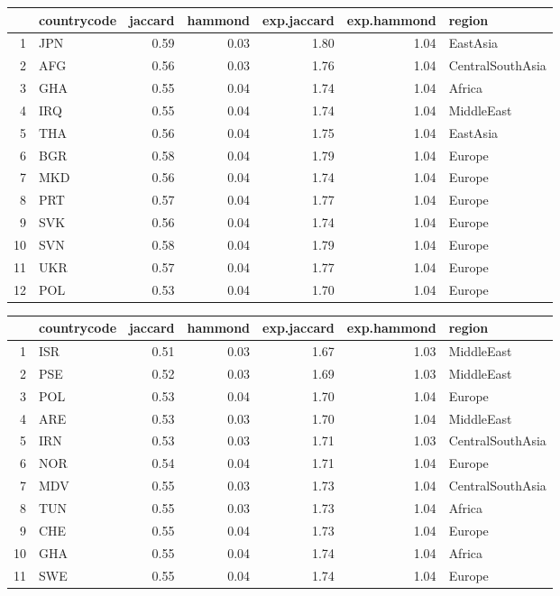 \documentclass[10pt,a4paper]{article}
\begin{document}
\begin{table}[ht]
\centering
\begin{tabular}{rlrrrrl}
  \hline
 & countrycode & jaccard & hammond & exp.jaccard & exp.hammond & region \\ 
  \hline
1 & JPN & 0.59 & 0.03 & 1.80 & 1.04 & EastAsia \\ 
  2 & AFG & 0.56 & 0.03 & 1.76 & 1.04 & CentralSouthAsia \\ 
  3 & GHA & 0.55 & 0.04 & 1.74 & 1.04 & Africa \\ 
  4 & IRQ & 0.55 & 0.04 & 1.74 & 1.04 & MiddleEast \\ 
  5 & THA & 0.56 & 0.04 & 1.75 & 1.04 & EastAsia \\ 
  6 & BGR & 0.58 & 0.04 & 1.79 & 1.04 & Europe \\ 
  7 & MKD & 0.56 & 0.04 & 1.74 & 1.04 & Europe \\ 
  8 & PRT & 0.57 & 0.04 & 1.77 & 1.04 & Europe \\ 
  9 & SVK & 0.56 & 0.04 & 1.74 & 1.04 & Europe \\ 
  10 & SVN & 0.58 & 0.04 & 1.79 & 1.04 & Europe \\ 
  11 & UKR & 0.57 & 0.04 & 1.77 & 1.04 & Europe \\ 
  12 & POL & 0.53 & 0.04 & 1.70 & 1.04 & Europe \\ 
   \hline
\end{tabular}
\end{table}

\begin{table}[ht]
\centering
\begin{tabular}{rlrrrrl}
  \hline
 & countrycode & jaccard & hammond & exp.jaccard & exp.hammond & region \\ 
  \hline
1 & ISR & 0.51 & 0.03 & 1.67 & 1.03 & MiddleEast \\ 
  2 & PSE & 0.52 & 0.03 & 1.69 & 1.03 & MiddleEast \\ 
  3 & POL & 0.53 & 0.04 & 1.70 & 1.04 & Europe \\ 
  4 & ARE & 0.53 & 0.03 & 1.70 & 1.04 & MiddleEast \\ 
  5 & IRN & 0.53 & 0.03 & 1.71 & 1.03 & CentralSouthAsia \\ 
  6 & NOR & 0.54 & 0.04 & 1.71 & 1.04 & Europe \\ 
  7 & MDV & 0.55 & 0.03 & 1.73 & 1.04 & CentralSouthAsia \\ 
  8 & TUN & 0.55 & 0.03 & 1.73 & 1.04 & Africa \\ 
  9 & CHE & 0.55 & 0.04 & 1.73 & 1.04 & Europe \\ 
  10 & GHA & 0.55 & 0.04 & 1.74 & 1.04 & Africa \\ 
  11 & SWE & 0.55 & 0.04 & 1.74 & 1.04 & Europe \\ 
   \hline
\end{tabular}
\end{table}
\end{document}
